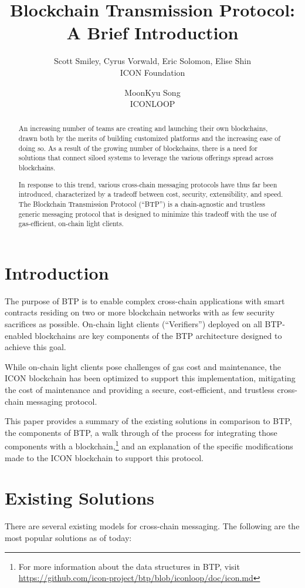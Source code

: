 \documentclass{article}
\title{Blockchain Transmission Protocol: A Brief Introduction}
\author{
  Scott Smiley, Cyrus Vorwald, Eric Solomon, Elise Shin \\
  ICON Foundation \\
  \and
  MoonKyu Song \\
  ICONLOOP \\
}
\begin{document}
\maketitle
\begin{abstract}
An increasing number of teams are creating and launching their own blockchains, drawn both by the merits of building customized platforms and the increasing ease of doing so. As a result of the growing number of blockchains, there is a need for solutions that connect siloed systems to leverage the various offerings spread across blockchains. 

In response to this trend, various cross-chain messaging protocols have thus far been introduced, characterized by a tradeoff between cost, security, extensibility, and speed. The Blockchain Transmission Protocol (“BTP”) is a chain-agnostic and trustless generic messaging protocol that is designed to minimize this tradeoff with the use of gas-efficient, on-chain light clients. 
\end{abstract}

\section{Introduction}
\label{sec:introduction}
The purpose of BTP is to enable complex cross-chain applications with smart contracts residing on two or more blockchain networks with as few security sacrifices as possible. On-chain light clients (“Verifiers”) deployed on all BTP-enabled blockchains are key components of the BTP architecture designed to achieve this goal. 

While on-chain light clients pose challenges of gas cost and maintenance, the ICON blockchain has been optimized to support this implementation, mitigating the cost of maintenance and providing a secure, cost-efficient, and trustless cross-chain messaging protocol.

This paper provides a summary of the existing solutions in comparison to BTP, the components of BTP, a walk through of the process for integrating those components with a blockchain,\footnote{For more information about the data structures in BTP, visit \url{https://github.com/icon-project/btp/blob/iconloop/doc/icon.md}} and an explanation of the specific modifications made to the ICON blockchain to support this protocol.

\section{Existing Solutions}
\label{sec:relatedwork}
There are several existing models for cross-chain messaging. The following are the most popular solutions as of today:
\end{document}
